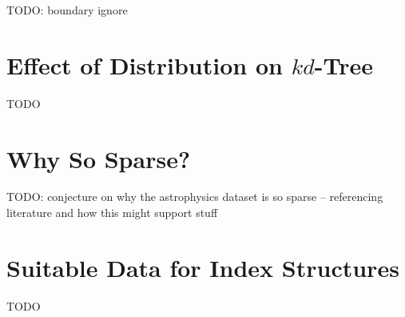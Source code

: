 TODO: boundary ignore

\begin{table}
	\centering
	\caption{Pyramid Tree Bucket Size Statistics with Different Samples of Astrophysics Dataset}
	\label{tab:final-bucket-size}
\end{table}


\section{Effect of Distribution on $kd$-Tree}

TODO

\section{Why So Sparse?}

TODO: conjecture on why the astrophysics dataset is so sparse -- referencing literature and how this might support stuff

\section{Suitable Data for Index Structures}

TODO
